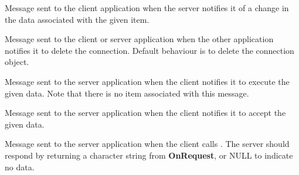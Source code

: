 \label{wxddeconnectiononadvise}


Message sent to the client application when the server notifies it of a
change in the data associated with the given item.

\label{wxddeconnectionondisconnect}


Message sent to the client or server application when the other
application notifies it to delete the connection. Default behaviour is
to delete the connection object.

\label{wxddeconnectiononexecute}


Message sent to the server application when the client notifies it to
execute the given data. Note that there is no item associated with
this message.

\label{wxddeconnectiononpoke}


Message sent to the server application when the client notifies it to
accept the given data.

\label{wxddeconnectiononrequest}


Message sent to the server application when the client
calls . The server
should respond by returning a character string from {\bf OnRequest},
or NULL to indicate no data.

\label{wxddeconnectiononstartadvise}


